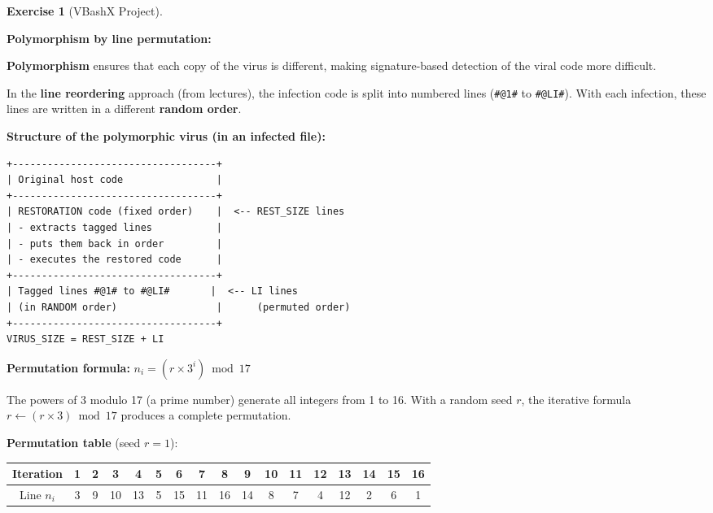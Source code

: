 \documentclass[a4paper,11pt]{article}
\theoremstyle{plain}
\theoremstyle{definition}
\newtheorem{exercice}{Exercise}
\begin{document}
\begin{exercice}[VBashX Project]
\begin{rappel}
\textbf{Polymorphism by line permutation:}

\textbf{Polymorphism} ensures that each copy of the virus is different, making signature-based detection of the viral code more difficult.

In the \textbf{line reordering} approach (from lectures), the infection code is split into numbered lines (\texttt{\#@1\#} to \texttt{\#@LI\#}). With each infection, these lines are written in a different \textbf{random order}.

\medskip
\textbf{Structure of the polymorphic virus (in an infected file):}
\begin{lstlisting}[numbers=none,frame=none,backgroundcolor=\color{white},language={}]
+-----------------------------------+
| Original host code                |
+-----------------------------------+
| RESTORATION code (fixed order)    |  <-- REST_SIZE lines
| - extracts tagged lines           |
| - puts them back in order         |
| - executes the restored code      |
+-----------------------------------+
| Tagged lines #@1# to #@LI#       |  <-- LI lines
| (in RANDOM order)                 |      (permuted order)
+-----------------------------------+
VIRUS_SIZE = REST_SIZE + LI
\end{lstlisting}

\medskip
\textbf{Permutation formula:} $n_i = (r \times 3^i) \bmod 17$

The powers of 3 modulo 17 (a prime number) generate all integers from 1 to 16. With a random seed $r$, the iterative formula $r \leftarrow (r \times 3) \bmod 17$ produces a complete permutation.

\medskip
\textbf{Permutation table} (seed $r = 1$):

\begin{center}
\begin{tabular}{c|cccccccccccccccc}
\toprule
Iteration & 1 & 2 & 3 & 4 & 5 & 6 & 7 & 8 & 9 & 10 & 11 & 12 & 13 & 14 & 15 & 16 \\
\midrule
Line $n_i$ & 3 & 9 & 10 & 13 & 5 & 15 & 11 & 16 & 14 & 8 & 7 & 4 & 12 & 2 & 6 & 1 \\
\bottomrule
\end{tabular}
\end{center}


\end{rappel}
\end{exercice}
\end{document}
